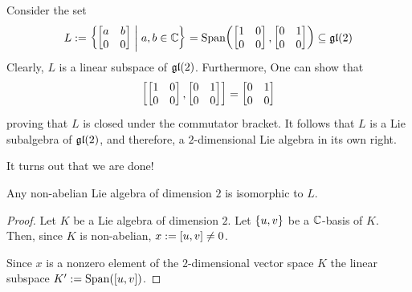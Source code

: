 \begin{boxexample}
    Consider the set
    \begin{align*}
        L := \left\{ 
            \begin{bmatrix}
                a & b \\ 0 & 0
            \end{bmatrix}
         \; \middle\vert \; a, b \in \mathbb{C} \right\}
        = \operatorname{Span}\!\left( \begin{bmatrix} 1 & 0 \\ 0 & 0 \end{bmatrix}, \begin{bmatrix} 0 & 1 \\ 0 & 0 \end{bmatrix} \right)
        \subseteq \mathfrak{gl}\!\left( 2 \right)
    \end{align*}
    Clearly, $L$ is a linear subspace of $\mathfrak{gl}\!\left( 2 \right)$. Furthermore, One can show that
    \begin{align*}
        \left[ 
            \begin{bmatrix} 1 & 0 \\ 0 & 0 \end{bmatrix}, \begin{bmatrix} 0 & 1 \\ 0 & 0 \end{bmatrix}
         \right] = \begin{bmatrix} 0 & 1 \\ 0 & 0 \end{bmatrix}
    \end{align*}
    proving that $L$ is closed under the commutator bracket. It follows that $L$ is a Lie subalgebra of $\mathfrak{gl}\!\left( 2 \right)$, and therefore, a $2$-dimensional Lie algebra in its own right.
\end{boxexample}

It turns out that we are done!

\begin{boxproposition}
    Any non-abelian Lie algebra of dimension $2$ is isomorphic to $L$.
\end{boxproposition}
\begin{proof}
    Let $K$ be a Lie algebra of dimension $2$. Let $\left\{ u, v \right\}$ be a $\mathbb{C}$-basis of $K$. Then, since $K$ is non-abelian, $x := \left[ u, v \right] \neq 0$.

    Since $x$ is a nonzero element of the $2$-dimensional vector space $K$ the linear subspace $K' := \operatorname{Span}\!\left( \left[ u, v \right] \right)$. 
\end{proof}
